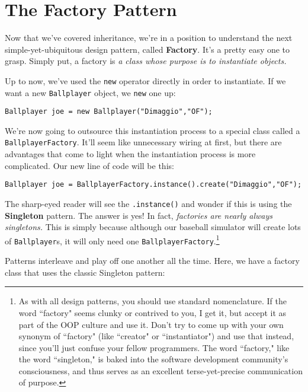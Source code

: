 
\chapter{The Factory Pattern}

Now that we've covered inheritance, we're in a position to understand the next
simple-yet-ubiquitous design pattern, called \textbf{Factory}. It's a pretty
easy one to grasp. Simply put, a factory is \textit{a class whose purpose is
to instantiate objects.}

Up to now, we've used the \texttt{new} operator directly in order to
instantiate. If we want a new \texttt{Ballplayer} object, we \texttt{new} one
up:

\begin{Verbatim}[fontsize=\small,samepage=true,frame=none]
  Ballplayer joe = new Ballplayer("Dimaggio","OF");
\end{Verbatim}

We're now going to outsource this instantiation process to a special class
called a \texttt{BallplayerFactory}. It'll seem like unnecessary wiring at
first, but there are advantages that come to light when the instantiation
process is more complicated. Our new line of code will be this:

\begin{Verbatim}[fontsize=\small,samepage=true,frame=none]
  Ballplayer joe = BallplayerFactory.instance().create("Dimaggio","OF");
\end{Verbatim}

The sharp-eyed reader will see the \texttt{.instance()} and wonder if this is
using the \textbf{Singleton} pattern. The answer is yes! In fact,
\textit{factories are nearly always singletons.} This is simply because
although our baseball simulator will create lots of \texttt{Ballplayer}s, it
will only need one \texttt{BallplayerFactory}.\footnote{As with all design
patterns, you should use standard nomenclature. If the word ``factory" seems
clunky or contrived to you, I get it, but accept it as part of the OOP culture
and use it. Don't try to come up with your own synonym of ``factory" (like
``creator" or ``instantiator") and use that instead, since you'll just confuse
your fellow programmers. The word ``factory," like the word ``singleton," is
baked into the software development community's consciousness, and thus serves
as an excellent terse-yet-precise communication of purpose.}

Patterns interleave and play off one another all the time. Here, we have a
factory class that uses the classic Singleton pattern:

